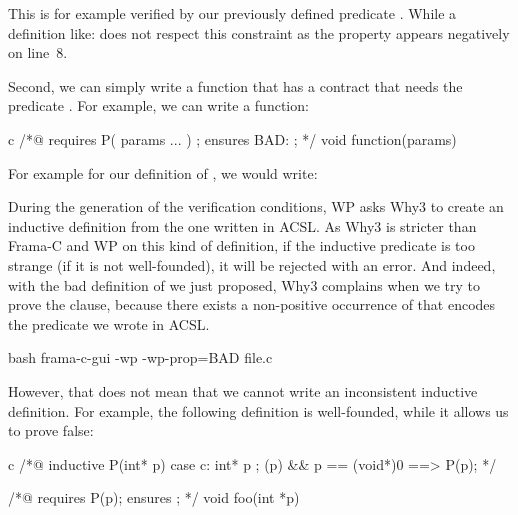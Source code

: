 This is for example verified by our previously defined predicate
. While a definition like:
does not respect this constraint as the property 
appears negatively on line~8.

Second, we can simply write a function that has a contract that needs the
predicate . For example, we can write a function:



\begin{CodeBlock}{c}
/*@
  requires P( params ... ) ;
  ensures  BAD: \false ;
*/ void function(params){

}
\end{CodeBlock}



For example for our definition of , we would write:






During the generation of the verification conditions, WP asks Why3 to create an
inductive definition from the one written in ACSL. As Why3 is stricter than
Frama-C and WP on this kind of definition, if the inductive predicate is too
strange (if it is not well-founded), it will be rejected with an error. And
indeed, with the bad definition of  we just proposed,
Why3 complains when we try to prove the
 clause, because there exists a
non-positive occurrence of  that encodes the
 predicate we wrote in ACSL.

\begin{CodeBlock}{bash}
frama-c-gui -wp -wp-prop=BAD file.c
\end{CodeBlock}





However, that does not mean that we cannot write an inconsistent inductive
definition. For example, the following definition is well-founded, while it
allows us to prove false:


\begin{CodeBlock}{c}
/*@ inductive P(int* p){
      case c: \forall int* p ; \valid(p) && p == (void*)0 ==> P(p);
    }
*/

/*@ requires P(p);
    ensures \false ; */
void foo(int *p){}
\end{CodeBlock}


